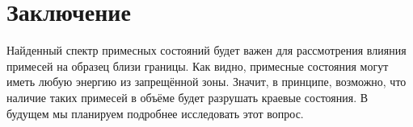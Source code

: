 \section{Заключение}
Найденный спектр примесных состояний будет важен для 
рассмотрения влияния примесей на образец близи границы. Как видно, примесные состояния
могут иметь любую энергию из запрещённой зоны. Значит, в принципе, 
возможно, что наличие таких примесей в объёме будет разрушать краевые состояния. В будущем мы
планируем подробнее исследовать этот вопрос.
